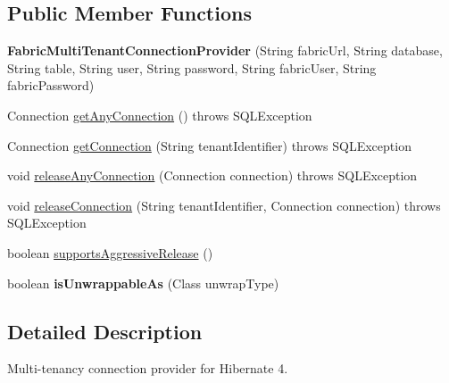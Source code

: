 \subsection*{Public Member Functions}
\begin{DoxyCompactItemize}
\item 
\mbox{\label{classcom_1_1mysql_1_1fabric_1_1hibernate_1_1_fabric_multi_tenant_connection_provider_a7e87e509e559ebb0547290d2fbfa8b4e}} 
{\bfseries Fabric\+Multi\+Tenant\+Connection\+Provider} (String fabric\+Url, String database, String table, String user, String password, String fabric\+User, String fabric\+Password)
\item 
Connection \mbox{\hyperlink{classcom_1_1mysql_1_1fabric_1_1hibernate_1_1_fabric_multi_tenant_connection_provider_a332592a3fea82e9f1b48b26ee2189566}{get\+Any\+Connection}} ()  throws S\+Q\+L\+Exception 
\item 
Connection \mbox{\hyperlink{classcom_1_1mysql_1_1fabric_1_1hibernate_1_1_fabric_multi_tenant_connection_provider_a5e2f7fa211f847bce86d4c89b1665ff6}{get\+Connection}} (String tenant\+Identifier)  throws S\+Q\+L\+Exception 
\item 
void \mbox{\hyperlink{classcom_1_1mysql_1_1fabric_1_1hibernate_1_1_fabric_multi_tenant_connection_provider_a40292c72bd0ebf6f73e17f57fcc2ca38}{release\+Any\+Connection}} (Connection connection)  throws S\+Q\+L\+Exception 
\item 
void \mbox{\hyperlink{classcom_1_1mysql_1_1fabric_1_1hibernate_1_1_fabric_multi_tenant_connection_provider_a7d6f77f42ea4f2e0c4569fbf4d58689d}{release\+Connection}} (String tenant\+Identifier, Connection connection)  throws S\+Q\+L\+Exception 
\item 
boolean \mbox{\hyperlink{classcom_1_1mysql_1_1fabric_1_1hibernate_1_1_fabric_multi_tenant_connection_provider_a29afe74bb8f6de43ece2e3ee66924d1c}{supports\+Aggressive\+Release}} ()
\item 
\mbox{\label{classcom_1_1mysql_1_1fabric_1_1hibernate_1_1_fabric_multi_tenant_connection_provider_af1bb4e826311ce7e4dac7c50f59e666e}} 
boolean {\bfseries is\+Unwrappable\+As} (Class unwrap\+Type)
\end{DoxyCompactItemize}


\subsection{Detailed Description}
Multi-\/tenancy connection provider for Hibernate 4.

